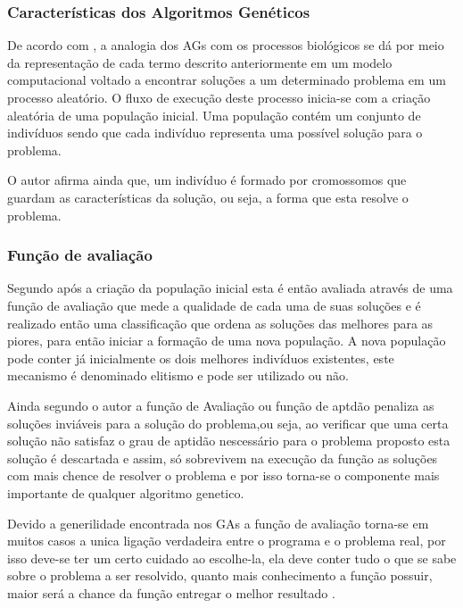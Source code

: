 \subsubsection{Características dos Algoritmos Genéticos}

\par De acordo com , a analogia dos AGs com
os processos biológicos se dá por meio da representação de cada termo descrito
anteriormente em um modelo computacional voltado a encontrar soluções a um
determinado problema em um processo aleatório. O fluxo de execução deste processo
inicia-se com a criação aleatória de uma população inicial. Uma população contém
um conjunto de indivíduos sendo que cada indivíduo  representa uma possível solução
para o problema.

\par O autor afirma ainda que, um indivíduo é formado por cromossomos que
guardam as características da solução, ou seja, a forma que esta resolve o
problema.

\subsubsection{Função de avaliação}

\par Segundo  após a criação da população
inicial esta é então avaliada através de uma função de avaliação que mede a qualidade de cada uma de suas soluções e é
realizado então uma classificação que ordena as soluções das melhores para as
piores, para então iniciar a formação de uma nova população. A nova população
pode conter já inicialmente os dois melhores indivíduos existentes, este
mecanismo é denominado elitismo e pode ser utilizado ou não.

\par Ainda segundo o autor a função de Avaliação ou função de aptdão penaliza as
soluções inviáveis para a solução do problema,ou seja, ao verificar que uma
certa solução não satisfaz o grau de aptidão nescessário para o problema
proposto esta solução é descartada e assim, só sobrevivem na execução da função
as soluções com mais chence de resolver o problema e por isso torna-se o
componente mais importante de qualquer algoritmo genetico.

\par Devido a generilidade encontrada nos GAs a função de avaliação
torna-se em muitos casos a unica ligação verdadeira entre o programa e o problema real, por
isso deve-se ter um certo cuidado ao escolhe-la, ela deve conter tudo o que se
sabe sobre o problema a ser resolvido, quanto mais conhecimento a função
possuir, maior será a chance da função entregar o melhor resultado
\cite{livro_ags_ricardo_linden}.


